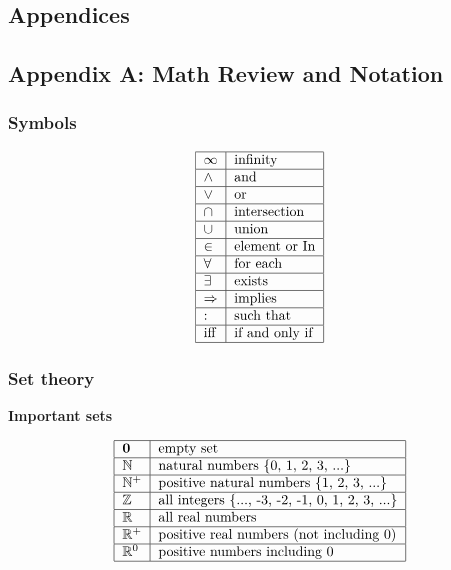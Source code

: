 \documentclass[justified, sixbynine]{tufte-book}
\def\subsubsection#1{{\bf #1}}
\theoremstyle{plain}%
\newtheorem * {corollary}{Corollary}
\theoremstyle{definition}
\theoremstyle{remark}
\newtheorem * {remark}{Remark}
\newtheorem * {note}{Note}
\begin{document}
\begin{fullwidth}
\chapter{Appendices}

\goodbreak\section{Appendix A: Math Review and Notation}

\goodbreak\subsection{Symbols}

\begin{equation}
\begin{tabular}{|l|l|}
\hline
$\infty $ & infinity \\ \hline
$\wedge $ & and \\ \hline
$\vee $ & or \\ \hline
$\cap $ & intersection \\ \hline
$\cup $ & union \\ \hline
$\in $ & element or In \\ \hline
$\forall $ & for each \\ \hline
$\exists $ & exists \\ \hline
$\Rightarrow $ & implies \\ \hline
: & such that \\ \hline
iff & if and only if \\ \hline
\end{tabular}
\end{equation}

\goodbreak\subsection{Set theory}

\subsubsection{Important sets}

\begin{equation}
\begin{tabular}{|l|l|}
\hline
${\bf 0}$ & empty set \\ \hline
$\mathbb{N}$ & natural numbers \{0, 1, 2, 3, ...\} \\ \hline
$\mathbb{N}^{+}$ & positive natural numbers \{1, 2, 3, ...\} \\ \hline
$\mathbb{Z}$ & all integers \{..., -3, -2, -1, 0, 1, 2, 3, ...\} \\ \hline
$\mathbb{R}$ & all real numbers \\ \hline
$\mathbb{R}^{+}$ & positive real numbers (not including 0) \\ \hline
$\mathbb{R}^{0}$ & positive numbers including 0 \\ \hline
\end{tabular}
\end{equation}


\end{fullwidth}
\end{document}
